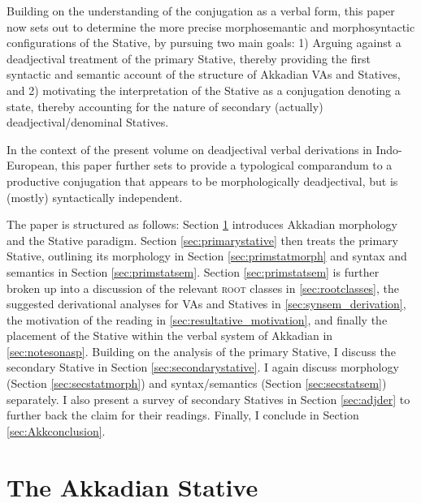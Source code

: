 \documentclass[output=paper,colorlinks,citecolor=brown]{langscibook}
\begin{document}
Building on the understanding of the conjugation as a verbal form, this paper now sets out to determine the more precise morphosemantic and morphosyntactic configurations of the Stative, by pursuing two main goals: 1) Arguing against a deadjectival  treatment of the primary Stative,  thereby providing the first syntactic and semantic account of the structure of Akkadian VAs and Statives, and 2) motivating the interpretation of the Stative as a conjugation denoting a  state, thereby accounting for the  nature of secondary (actually) deadjectival/denominal Statives. 

In the context of the present volume on deadjectival verbal derivations  in Indo-European, this paper further sets to provide a typological comparandum to a productive conjugation that appears to be morphologically deadjectival, but is (mostly) syntactically independent.

The paper is structured as follows: Section \ref{sec:theakkstative} introduces Akkadian morphology and the Stative paradigm. Section \ref{sec:primarystative} then treats the primary Stative, outlining its morphology in Section \ref{sec:primstatmorph} and syntax and semantics in Section \ref{sec:primstatsem}. Section \ref{sec:primstatsem} is further broken up into a discussion of the relevant \textsc{root} classes in \ref{sec:rootclasses}, the suggested derivational analyses for VAs and Statives in \ref{sec:synsem_derivation}, the motivation of the  reading in \ref{sec:resultative_motivation}, and finally the placement of the Stative within the verbal system of Akkadian in \ref{sec:notesonasp}. Building on the analysis of the primary Stative, I discuss the secondary Stative in Section \ref{sec:secondarystative}. I again discuss morphology (Section \ref{sec:secstatmorph}) and syntax/semantics (Section \ref{sec:secstatsem}) separately. I also present a survey of secondary Statives in Section \ref{sec:adjder} to further back the claim for their  readings. Finally, I conclude in Section \ref{sec:Akkconclusion}.



\section{The Akkadian Stative}
\label{sec:theakkstative}
\end{document}
